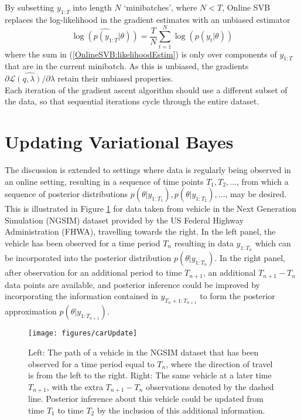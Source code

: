 \documentclass[12pt,a4paper]{article}\usepackage[]{graphicx}\usepackage[]{color}
\begin{document}
By subsetting $y_{1:T}$ into length $N$ `minibatches', where $N < T$, Online SVB replaces the log-likelihood in the gradient estimates with an unbiased estimator
\begin{equation}
\label{OnlineSVB:likelihoodEstim}
\widehat{\log(p(y_{1:T} | \theta))} = \frac{T}{N} \sum_{t=1}^N \log(p(y_t | \theta))
\end{equation}
where the sum in (\ref{OnlineSVB:likelihoodEstim}) is only over components of $y_{1:T}$ that are in the current minibatch. As this is unbiased, the gradients $\widehat{\partial\mathcal{L}(q, \lambda) / \partial \lambda}$ retain their unbiased properties.
\\

Each iteration of the gradient ascent algorithm should use a different subset of the data, so that sequential iterations cycle through the entire dataset. 
\\

\section{Updating Variational Bayes}
\label{sec:UVB}

The discussion is extended to settings where data is regularly being observed in an online setting, resulting in a sequence of time points $T_1, T_2, \ldots$, from which a sequence of posterior distributions $p(\theta | y_{1:T_1}), p(\theta | y_{1:T_2}), \ldots$, may be desired.
\\

This is illustrated in Figure \ref{fig:updatetimeUpdate} for data taken from vehicle in the Next Generation Simulation (NGSIM) dataset provided by the US Federal Highway Administration (FHWA), travelling towards the right. In the left panel, the vehicle has been observed for a time period $T_{n}$ resulting in data $y_{1:T_{n}}$ which can be incorporated into the posterior distribution $p(\theta | y_{1:T_{n}})$. In the right panel, after observation for an additional period to time $T_{n+1}$, an additional $T_{n+1} - T_{n}$ data points are available, and posterior inference could be improved by incorporating the information contained in $y_{T_{n}+1:T_{n+1}}$ to form the posterior approximation $p(\theta | y_{1:T_{n+1}})$.

\begin{figure}[htbp]
\centering
\texttt{[image: figures/carUpdate]}
\caption{Left: The path of a vehicle in the NGSIM dataset that has been observed for a time period equal to $T_{n}$, where the direction of travel is from the left to the right. Right: The same vehicle at a later time $T_{n+1}$, with the extra $T_{n+1} - T_{n}$ observations denoted by the dashed line. Posterior inference about this vehicle could be updated from time $T_{1}$ to time $T_{2}$ by the inclusion of this additional information.}
\label{fig:updatetimeUpdate}
\end{figure}
\end{document}
